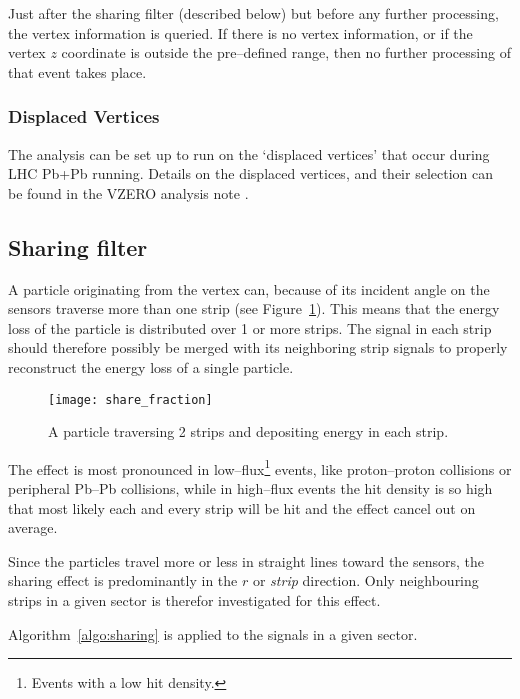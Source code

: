 \documentclass[11pt]{article}
\def\AlwaysText#1{\ifmmode\relax\text{#1}\else #1\fi}
\newcommand{\AbbrName}[1]{\AlwaysText{{\scshape #1}}}
\newcommand{\FMD}[1][]{\AbbrName{fmd\ifx|#1|\else#1\fi}}
\newcommand{\figref}[1]{Figure~\ref{#1}}
\begin{document}
Just after the sharing filter (described below) but before any further
processing, the vertex information is queried.  If there is no vertex
information, or if the vertex $z$ coordinate is outside the
pre--defined range, then no further processing of that event takes place. 

\subsubsection{Displaced Vertices}
\label{sec:sub:sub:dispvtx}

The analysis can be set up to run on the `displaced vertices' that
occur during LHC Pb+Pb running. Details on the displaced vertices, and
their selection can be found in the VZERO analysis note \cite{maxime}.
\subsection{Sharing filter}
\label{sec:sub:sharing_filter}

A particle originating from the vertex can, because of its incident
angle on the \FMD{} sensors traverse more than one strip (see
\figref{fig:share_fraction}).  This means that the energy loss of the
particle is distributed over 1 or more strips.  The signal in each
strip should therefore possibly be merged with its neighboring strip
signals to properly reconstruct the energy loss of a single particle.

\begin{figure}[htbp]
  \centering
  \texttt{[image: share\_fraction]}
  \caption{A particle traversing 2 strips and depositing energy in
    each strip. }
  \label{fig:share_fraction}
\end{figure}

The effect is most pronounced in low--flux\footnote{Events with a low
  hit density.} events, like proton--proton collisions or peripheral
Pb--Pb collisions, while in high--flux events the hit density is so
high that most likely each and every strip will be hit and the effect
cancel out on average.

Since the particles travel more or less in straight lines toward the
\FMD{} sensors, the sharing effect is predominantly in the $r$ or
\emph{strip} direction.  Only neighbouring strips in a given sector is
therefor investigated for this effect.  

Algorithm~\ref{algo:sharing} is applied to the signals in a given
sector.
\end{document}
